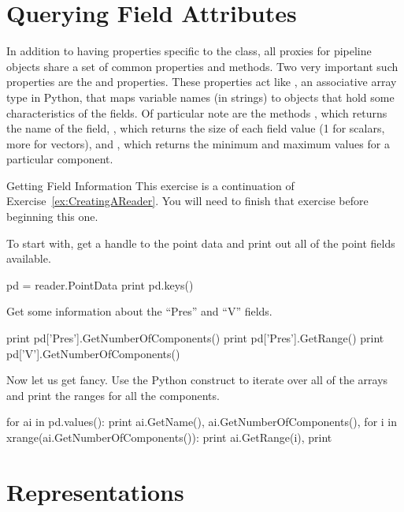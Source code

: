 \section{Querying Field Attributes}
\label{sec:QueryingFieldAttributes}

In addition to having properties specific to the class, all proxies for
pipeline objects share a set of common properties and methods.  Two very
important such properties are the  and
 properties.  These properties act like
, an associative array type in Python, that maps
variable names (in strings) to  objects that
hold some characteristics of the fields.  Of particular note are the
 methods , which returns the
name of the field, , which returns the size
of each field value (1 for scalars, more for vectors), and
, which returns the minimum and maximum values for a
particular component.

\begin{exercise}{Getting Field Information}
  \label{ex:GettingFieldInformation}%
  This exercise is a continuation of Exercise~\ref{ex:CreatingAReader}.
  You will need to finish that exercise before beginning this one.

  To start with, get a handle to the point data and print out all of the
  point fields available.
  \begin{python}
pd = reader.PointData
print pd.keys()
  \end{python}

  Get some information about the ``Pres'' and ``V'' fields.
  \begin{python}
print pd['Pres'].GetNumberOfComponents()
print pd['Pres'].GetRange()
print pd['V'].GetNumberOfComponents()
  \end{python}

  Now let us get fancy.  Use the Python  construct to iterate
  over all of the arrays and print the ranges for all the components.
  \begin{python}
for ai in pd.values():
    print ai.GetName(), ai.GetNumberOfComponents(),
    for i in xrange(ai.GetNumberOfComponents()):
        print ai.GetRange(i),
    print
  \end{python}
\end{exercise}


\section{Representations}
\label{sec:Representations}

